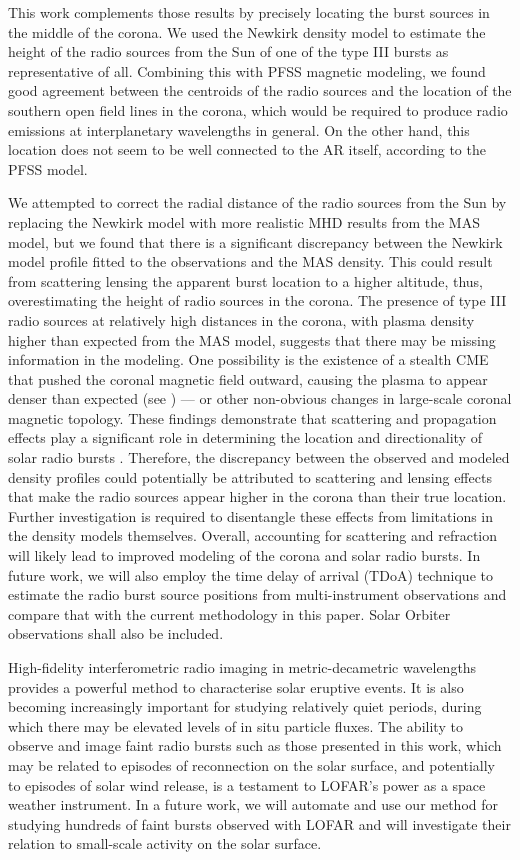 This work complements those results by precisely locating  the burst sources in the middle of the corona. We used the Newkirk density model to estimate the height of the radio sources from the Sun of one of the type III bursts as representative of all. Combining this with PFSS magnetic modeling, we found good agreement between the centroids of the radio sources and the location of the southern open field lines in the corona, which would be required to produce radio emissions at interplanetary wavelengths in general. On the other hand, this location does not seem to be well connected to the AR itself, according to the PFSS model.

We attempted to correct the radial distance of the radio sources from the Sun by replacing the Newkirk model with more realistic MHD results from the MAS model, but we found that there is a significant discrepancy between the Newkirk model profile fitted to the observations and the MAS density.
This could result from scattering lensing the apparent burst location to a higher altitude, thus, overestimating the height of radio sources in the corona.
The presence of type III radio sources at relatively high distances in the corona, with plasma density higher than expected from the MAS model, suggests that there may be missing information in the modeling. One possibility is the existence of a stealth CME that pushed the coronal magnetic field outward, causing the plasma to appear denser than expected (see \citet{dumbovic_2021}) — or other non-obvious changes in large-scale coronal magnetic topology.
These findings demonstrate that scattering and propagation effects play a significant role in determining the location and directionality of solar radio bursts \citep{kontar_2019, kontar_2023, chen_2023}. Therefore, the discrepancy between the observed and modeled density profiles could potentially be attributed to scattering and lensing effects that make the radio sources appear higher in the corona than their true location. Further investigation is required to disentangle these effects from limitations in the density models themselves. Overall, accounting for scattering and refraction will likely lead to improved modeling of the corona and solar radio bursts.
In future work, we will also employ the time delay of arrival (TDoA) technique \citep{zhang_2019} to estimate the radio burst source positions from multi-instrument observations and compare that with the current methodology in this paper. Solar Orbiter observations shall also be included.

High-fidelity interferometric radio imaging in metric-decametric wavelengths provides a powerful method to characterise solar eruptive events. It is also becoming increasingly important for studying relatively quiet periods, during which there may be elevated levels of in situ particle fluxes. The ability to observe and image faint radio bursts such as those presented in this work, which may be related to episodes of reconnection on the solar surface, and potentially to episodes of solar wind release, is a testament to LOFAR’s power as a space weather instrument. In a future work, we will automate and use our method for studying hundreds of faint bursts observed with LOFAR and will investigate their relation to small-scale activity on the solar surface.

